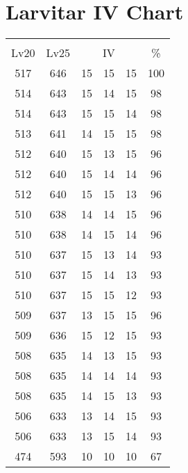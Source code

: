 \documentclass{article}%
\begin{document}
%
\normalsize%
\section{Larvitar IV Chart}%
\label{sec:Larvitar IV Chart}%
\renewcommand{\arraystretch}{1.5}%
\begin{tabular}{|c|c|c|c|c|c|}%
\hline%
\multicolumn{6}{|c|}{\textcolor{white}{ 
\linebreak{Larvitar}
}%
\cellcolor{black}}\\%
\multicolumn{1}{|c}{Lv20}&\multicolumn{1}{c|}{Lv25}&\multicolumn{3}{c|}{IV}&\multicolumn{1}{|c|}{\%}\\%
\hline%
\rowcolor{color100}%
517&646&15&15&15&100\\%
\hline%
\rowcolor{color98}%
514&643&15&14&15&98\\%
\hline%
\rowcolor{color98}%
514&643&15&15&14&98\\%
\hline%
\rowcolor{color98}%
513&641&14&15&15&98\\%
\hline%
\rowcolor{color96}%
512&640&15&13&15&96\\%
\hline%
\rowcolor{color96}%
512&640&15&14&14&96\\%
\hline%
\rowcolor{color96}%
512&640&15&15&13&96\\%
\hline%
\rowcolor{color96}%
510&638&14&14&15&96\\%
\hline%
\rowcolor{color96}%
510&638&14&15&14&96\\%
\hline%
\rowcolor{color93}%
510&637&15&13&14&93\\%
\hline%
\rowcolor{color93}%
510&637&15&14&13&93\\%
\hline%
\rowcolor{color93}%
510&637&15&15&12&93\\%
\hline%
\rowcolor{color96}%
509&637&13&15&15&96\\%
\hline%
\rowcolor{color93}%
509&636&15&12&15&93\\%
\hline%
\rowcolor{color93}%
508&635&14&13&15&93\\%
\hline%
\rowcolor{color93}%
508&635&14&14&14&93\\%
\hline%
\rowcolor{color93}%
508&635&14&15&13&93\\%
\hline%
\rowcolor{color93}%
506&633&13&14&15&93\\%
\hline%
\rowcolor{color93}%
506&633&13&15&14&93\\%
\hline%
\rowcolor{color91}%
474&593&10&10&10&67\\%
\end{tabular}

%
\end{document}
